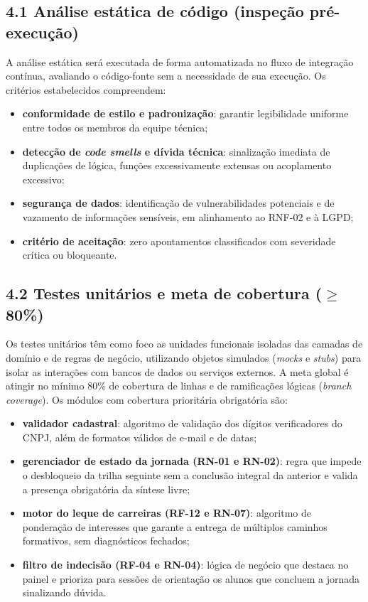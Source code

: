 \begin{apendicesenv}
\subsection*{4.1 Análise estática de código (inspeção pré-execução)}

A análise estática será executada de forma automatizada no fluxo de integração contínua, avaliando o código-fonte sem a necessidade de sua execução. Os critérios estabelecidos compreendem:

\begin{itemize}
  \item \textbf{conformidade de estilo e padronização}: garantir legibilidade uniforme entre todos os membros da equipe técnica;
  \item \textbf{detecção de \textit{code smells} e dívida técnica}: sinalização imediata de duplicações de lógica, funções excessivamente extensas ou acoplamento excessivo;
  \item \textbf{segurança de dados}: identificação de vulnerabilidades potenciais e de vazamento de informações sensíveis, em alinhamento ao RNF-02 e à LGPD;
  \item \textbf{critério de aceitação}: zero apontamentos classificados com severidade crítica ou bloqueante.
\end{itemize}

\subsection*{4.2 Testes unitários e meta de cobertura ($\geq$ 80\%)}

Os testes unitários têm como foco as unidades funcionais isoladas das camadas de domínio e de regras de negócio, utilizando objetos simulados (\textit{mocks} e \textit{stubs}) para isolar as interações com bancos de dados ou serviços externos. A meta global é atingir no mínimo 80\% de cobertura de linhas e de ramificações lógicas (\textit{branch coverage}). Os módulos com cobertura prioritária obrigatória são:

\begin{itemize}
  \item \textbf{validador cadastral}: algoritmo de validação dos dígitos verificadores do CNPJ, além de formatos válidos de e-mail e de datas;
  \item \textbf{gerenciador de estado da jornada (RN-01 e RN-02)}: regra que impede o desbloqueio da trilha seguinte sem a conclusão integral da anterior e valida a presença obrigatória da síntese livre;
  \item \textbf{motor do leque de carreiras (RF-12 e RN-07)}: algoritmo de ponderação de interesses que garante a entrega de múltiplos caminhos formativos, sem diagnósticos fechados;
  \item \textbf{filtro de indecisão (RF-04 e RN-04)}: lógica de negócio que destaca no painel e prioriza para sessões de orientação os alunos que concluem a jornada sinalizando dúvida.
\end{itemize}


\end{apendicesenv}
